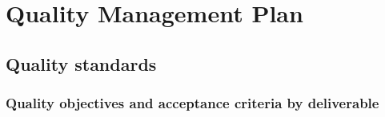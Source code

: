 
\clearpage
\clearpage
\section{Quality Management Plan}\label{sec:6}
\subsection{Quality standards}\label{sec:6.1}
\subsubsection{Quality objectives and acceptance criteria by deliverable}\label{sec:quality-objectives-and-acceptance-criteria-by-deliverable}

